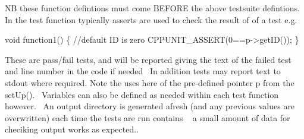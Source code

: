  NB these function defintions must come B\+E\+F\+O\+RE the above testsuite defintions.~\newline
In the test function typically asserts are used to check the result of of a test e.\+g. 
\begin{DoxyCode}
\textcolor{keywordtype}{void} function1()
\{
    \textcolor{comment}{//default ID is zero}
    CPPUNIT\_ASSERT(0==p->getID());
    \}
\end{DoxyCode}
 These are pass/fail tests, and will be reported giving the text of the failed test and line number in the code if needed~\newline
In addition tests may report text to stdout where required. Note the uses here of the pre-\/defined pointer p from the set\+Up().~\newline
Variables can also be defined as needed within each test function however.~\newline
An output directory is generated afresh (and any previous values are overwritten) each time the tests are run contains ~\newline
 a small amount of data for checiking output works as expected.. 